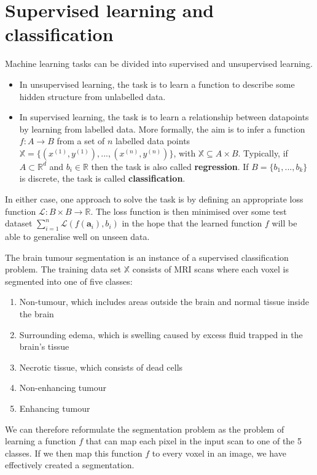 \documentclass[12pt,a4paper,twoside,openright]{report}
\begin{document}
\section{Supervised learning and classification}
Machine learning tasks can be divided into supervised and unsupervised learning.
\begin{itemize}
	\item In unsupervised learning, the task is to learn a function to describe some hidden structure from unlabelled data. 
	\item In supervised learning, the task is to learn a relationship between datapoints by learning from labelled data. More formally, the aim is to infer a function $f: A \to B$ from a set of $n$ labelled data points $\mathbb{X} = \{(x^{(1)}, y^{(1)}), ..., (x^{(n)}, y^{(n)})\}$, with $\mathbb{X} \subseteq A \times B$. Typically, if $A \subset \mathbb{R}^d$ and $b_i \in \mathbb{R}$ then the task is also called \textbf{regression}. If $B = \{b_1, ..., b_k\}$ is discrete, the task is called \textbf{classification}. 
\end{itemize} 
In either case, one approach to solve the task is by defining an appropriate loss function $\mathcal{L}: B \times B \to \mathbb{R}$. The loss function is then minimised over some test dataset $\sum_{i=1}^n \mathcal{L}(f(\textbf{a}_i), b_i)$ in the hope that the learned function $f$ will be able to generalise well on unseen data.

The brain tumour segmentation is an instance of a supervised classification problem. The training data set $\mathbb{X}$ consists of MRI scans where each voxel is segmented into one of five classes:
\begin{enumerate}
	\item Non-tumour, which includes areas outside the brain and normal tissue inside the brain
	\item Surrounding edema, which is swelling caused by excess fluid trapped in the brain's tissue
	\item Necrotic tissue, which consists of dead cells
	\item Non-enhancing tumour
	\item Enhancing tumour
\end{enumerate} 
We can therefore reformulate the segmentation problem as the problem of learning a function $f$ that can map each pixel in the input scan to one of the 5 classes. If we then map this function $f$ to every voxel in an image, we have effectively created a segmentation.
\end{document}
